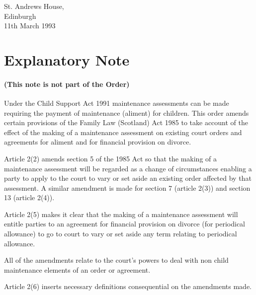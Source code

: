 \documentclass[a4paper]{article}
\newcommand{\parthead}{}
\begin{document}
\noindent
St. Andrews House,\\
Edinburgh\\
11th March 1993

\part{Explanatory Note}

\renewcommand\parthead{--- Explanatory Note}

\subsection*{(This note is not part of the Order)}

Under the Child Support Act 1991 maintenance assessments can be made requiring the payment of maintenance (aliment) for children. This order amends certain provisions of the Family Law (Scotland) Act 1985 to take account of the effect of the making of a maintenance assessment on existing court orders and agreements for aliment and for financial provision on divorce.

  Article 2(2) amends section 5 of the 1985 Act so that the making of a maintenance assessment will be regarded as a change of circumstances enabling a party to apply to the court to vary or set aside an existing order affected by that assessment. A similar amendment is made for section 7 (article 2(3)) and section 13 (article 2(4)).

  Article 2(5) makes it clear that the making of a maintenance assessment will entitle parties to an agreement for financial provision on divorce (for periodical allowance) to go to court to vary or set aside any term relating to periodical allowance.

  All of the amendments relate to the court’s powers to deal with non child maintenance elements of an order or agreement.

  Article 2(6) inserts necessary definitions consequential on the amendments made.
\end{document}
